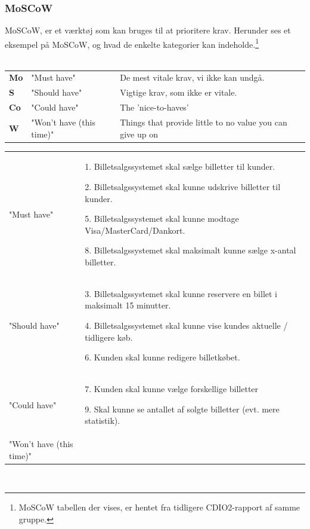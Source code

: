 \subsubsection{MoSCoW}

MoSCoW, er et værktøj som kan bruges til at prioritere krav.
Herunder ses et eksempel på MoSCoW, og hvad de enkelte kategorier kan indeholde.\footnote{MoSCoW tabellen der vises, er hentet fra tidligere CDIO2-rapport af samme gruppe.} \\\\

\begin{tabular}{lll}
    \textbf{Mo} &   
    "Must have"                 &
    De mest vitale krav, vi ikke kan undgå. \\

    \textbf{S}  &   
    "Should have"               & 
    Vigtige krav, som ikke er vitale. \\

    \textbf{Co} &   
    "Could have"                & 
    The 'nice-to-haves' \\

    \textbf{W}  &   
    "Won’t have (this time)"    & 
    Things that provide little to no value you can give up on \\

\end{tabular}

\begin{tabular}{ll}
    "Must have"                 &
    1. Billetsalgssystemet skal sælge billetter til kunder.

    2. Billetsalgssystemet skal kunne udskrive billetter til kunder.

    5. Billetsalgssystemet skal kunne modtage Visa/MasterCard/Dankort.

    8. Billetsalgssystemet skal maksimalt kunne sælge x-antal billetter.

    \\

    "Should have"               & 
    3. Billetsalgssystemet skal kunne reservere en billet i maksimalt 15 minutter.

    4. Billetsalgssystemet skal kunne vise kundes aktuelle / tidligere køb.

    6. Kunden skal kunne redigere billetkøbet.

    \\

    "Could have"                & 
    7. Kunden skal kunne vælge forskellige billetter

    9. Skal kunne se antallet af solgte billetter (evt. mere statistik).

    \\

    "Won’t have (this time)"    & 
    \\

\end{tabular}
\\

